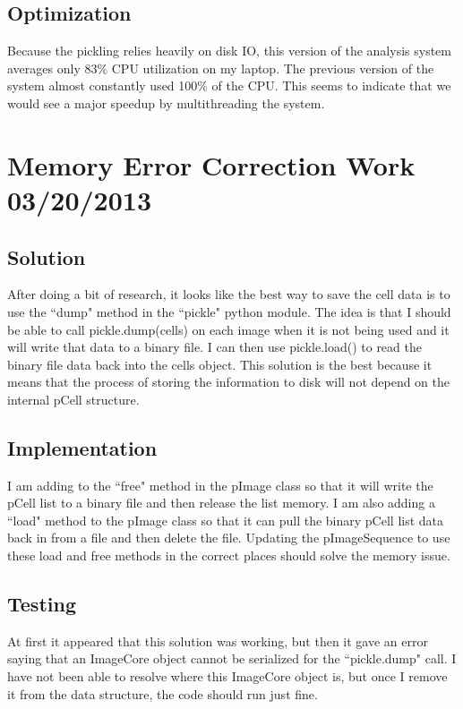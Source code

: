\documentclass[]{article}
\begin{document}
		\subsection{Optimization}
			Because the pickling relies heavily on disk IO, this version of the analysis system averages only 83\% CPU utilization on my laptop. The previous version of the system almost constantly used 100\% of the CPU. This seems to indicate that we would see a major speedup by multithreading the system.
	
	\section{Memory Error Correction Work 03/20/2013}
		\subsection{Solution}
			After doing a bit of research, it looks like the best way to save the cell data is to use the ``dump" method in the ``pickle" python module. The idea is that I should be able to call pickle.dump(cells) on each image when it is not being used and it will write that data to a binary file. I can then use pickle.load() to read the binary file data back into the cells object. This solution is the best because it means that the process of storing the information to disk will not depend on the internal pCell structure. 
			
		\subsection{Implementation}
			I am adding to the ``free" method in the pImage class so that it will write the pCell list to a binary file and then release the list memory. I am also adding a ``load" method to the pImage class so that it can pull the binary pCell list data back in from a file and then delete the file. Updating the pImageSequence to use these load and free methods in the correct places should solve the memory issue.
			
		\subsection{Testing}
			At first it appeared that this solution was working, but then it gave an error saying that an ImageCore object cannot be serialized for the ``pickle.dump" call. I have not been able to resolve where this ImageCore object is, but once I remove it from the data structure, the code should run just fine. 
	
\end{document}
